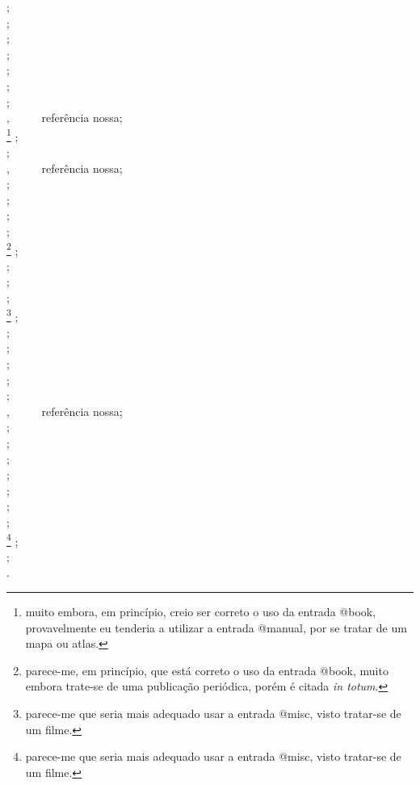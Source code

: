 \begin{apendicesenv}
{	\cite{lucci1994} ;\\
	\cite{lujan1993} ;\\
	\cite{maia1995} ;\\
	\cite{makau1962} ;\\
	\cite{mandino1994} ;\\
	\cite{marcondes1993} ;\\
	\cite{marques1993} ;\\
	\cite{Maturana2003} , \ \ \ \ \ referência nossa;\\
	\cite{michalany1981}\footnote{muito embora, em princípio, creio ser correto o uso da entrada {\ttfamily @book}, provavelmente eu tenderia a utilizar a entrada {\ttfamily @manual}, por se tratar de um mapa ou atlas.}  ;\\
	\cite{miglori1993} ;\\
	\cite{Mittelbach2004} , \ \ \ \ \ referência nossa;\\
	\cite{moore1960} ;\\
	\cite{wmoore1960} ;\\
	\cite{passos1995} ;\\
	\cite{pastro1993} ;\\
	\cite{paulista1941}\footnote{parece-me, em princípio, que está correto o uso da entrada {\ttfamily @book}, muito embora trate-se de uma publicação periódica, porém é citada \textit{in totum}.}  ;\\
	\cite{pedrosa1995} ;\\
	\cite{pelosi1993} ;\\
	\cite{piaget1980} ;\\
	\cite{riofilme1998}\footnote{parece-me que seria mais adequado usar a entrada {\ttfamily @misc}, visto tratar-se de um filme.} ;\\
	\cite{rodrigues1994} ;\\
	\cite{ruch1926} ;\\
	\cite{saadi1994} ;\\
	\cite{schaum1956} ;\\
	\cite{silva1996} ;\\
	\cite{Silva2000} , \ \ \ \ \ referência nossa;\\
	\cite{swokowski1994} ;\\
	\cite{tabak1993} ;\\
	\cite{tamandare1993} ;\\
	\cite{torelly1991} ;\\
	\cite{tourinho1994} ;\\
	\cite{tringali1994} ;\\
	\cite{urani1994} ;\\
	\cite{warner1991}\footnote{parece-me que seria mais adequado usar a entrada {\ttfamily @misc}, visto tratar-se de um filme.} ;\\
	\cite{zani1995} ;\\
	\cite{zilberman1998}.\\
}




\end{apendicesenv}
